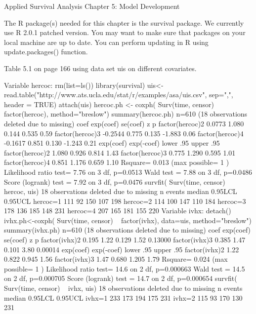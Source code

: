 Applied Survival Analysis
Chapter 5: Model Development

The R package(s) needed for this chapter is the survival package. We currently use R 2.0.1 patched version. You may want to make sure that packages on your local machine are up to date. You can perform updating in R using update.packages() function.

Table 5.1 on page 166 using data set uis on different covariates.

Variable hercoc:
rm(list=ls())
library(survival)
uis<-read.table("http://www.ats.ucla.edu/stat/r/examples/asa/uis.csv", sep=",", header = TRUE) 
attach(uis)
hercoc.ph <- coxph( Surv(time, censor) ~ factor(hercoc), method="breslow")
summary(hercoc.ph)
  n=610 (18 observations deleted due to missing)
                   coef exp(coef) se(coef)      z    p
factor(hercoc)2  0.0773     1.080    0.144  0.535 0.59
factor(hercoc)3 -0.2544     0.775    0.135 -1.883 0.06
factor(hercoc)4 -0.1617     0.851    0.130 -1.243 0.21
                exp(coef) exp(-coef) lower .95 upper .95
factor(hercoc)2     1.080      0.926     0.814      1.43
factor(hercoc)3     0.775      1.290     0.595      1.01
factor(hercoc)4     0.851      1.176     0.659      1.10
Rsquare= 0.013   (max possible= 1 )
Likelihood ratio test= 7.76  on 3 df,   p=0.0513
Wald test            = 7.88  on 3 df,   p=0.0486
Score (logrank) test = 7.92  on 3 df,   p=0.0476
survfit( Surv(time, censor) ~ hercoc, uis)
   18 observations deleted due to missing 
           n events median 0.95LCL 0.95UCL
hercoc=1 111     92    150     107     198
hercoc=2 114    100    147     110     184
hercoc=3 178    136    185     148     231
hercoc=4 207    165    181     155     220
Variable ivhx:
detach()
ivhx.ph<-coxph( Surv(time, censor) ~ factor(ivhx), data=uis, method="breslow")
summary(ivhx.ph)
  n=610 (18 observations deleted due to missing)
               coef exp(coef) se(coef)    z       p
factor(ivhx)2 0.195      1.22    0.129 1.52 0.13000
factor(ivhx)3 0.385      1.47    0.101 3.80 0.00014
              exp(coef) exp(-coef) lower .95 upper .95
factor(ivhx)2      1.22      0.822     0.945      1.56
factor(ivhx)3      1.47      0.680     1.205      1.79
Rsquare= 0.024   (max possible= 1 )
Likelihood ratio test= 14.6  on 2 df,   p=0.000663
Wald test            = 14.5  on 2 df,   p=0.000705
Score (logrank) test = 14.7  on 2 df,   p=0.000654
survfit( Surv(time, censor) ~ ivhx, uis)
   18 observations deleted due to missing 
         n events median 0.95LCL 0.95UCL
ivhx=1 233    173    194     175     231
ivhx=2 115     93    170     130     231

